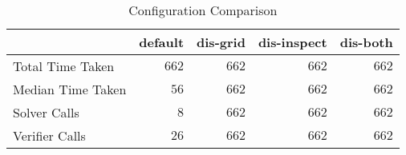 \begin{table}[!h]
\caption{Configuration Comparison}
\label{Ta:configuration_comparison}
\begin{center}

\def\arraystretch{1.1}
\setlength\tabcolsep{7pt}

\begin{tabular}{|l|r|r|r|r|}
\hline

\multicolumn{1}{|c|}{} & \multicolumn{1}{|c|}{\textbf{default}} & \multicolumn{1}{|c|}{\textbf{dis-grid}} & \multicolumn{1}{|c|}{\textbf{dis-inspect}} & \multicolumn{1}{|c|}{\textbf{dis-both}} \\ \hline \hline
Total Time Taken & $662$ & $662$ & $662$ & $662$\\ \hline
Median Time Taken & $56$ & $662$ & $662$ & $662$\\ \hline
Solver Calls & $8$ & $662$ & $662$ & $662$\\ \hline
Verifier Calls & $26$ & $662$ & $662$ & $662$\\ \hline

\end{tabular}

\end{center}
\end{table}
